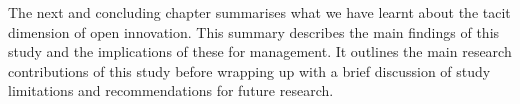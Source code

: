 The next and concluding chapter summarises what we have learnt about the tacit dimension of open innovation. This summary describes the main findings of this study and the implications of these for management. It outlines the main research contributions of this study before wrapping up with a brief discussion of study limitations and recommendations for future research. 